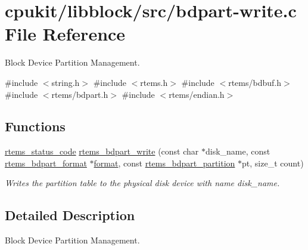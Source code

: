 \hypertarget{bdpart-write_8c}{}\section{cpukit/libblock/src/bdpart-\/write.c File Reference}
\label{bdpart-write_8c}


Block Device Partition Management.  


{\ttfamily \#include $<$string.\+h$>$}\newline
{\ttfamily \#include $<$rtems.\+h$>$}\newline
{\ttfamily \#include $<$rtems/bdbuf.\+h$>$}\newline
{\ttfamily \#include $<$rtems/bdpart.\+h$>$}\newline
{\ttfamily \#include $<$rtems/endian.\+h$>$}\newline
\subsection*{Functions}
\begin{DoxyCompactItemize}
\item 
\mbox{\hyperlink{group__ClassicStatus_ga545d41846817eaba6143d52ee4d9e9fe}{rtems\+\_\+status\+\_\+code}} \mbox{\hyperlink{group__rtems__bdpart_gaa8b69004c352fe7867bdcb551453beb0}{rtems\+\_\+bdpart\+\_\+write}} (const char $\ast$disk\+\_\+name, const \mbox{\hyperlink{unionrtems__bdpart__format}{rtems\+\_\+bdpart\+\_\+format}} $\ast$\mbox{\hyperlink{structformat}{format}}, const \mbox{\hyperlink{structrtems__bdpart__partition}{rtems\+\_\+bdpart\+\_\+partition}} $\ast$pt, size\+\_\+t count)
\begin{DoxyCompactList}\small\item\em Writes the partition table to the physical disk device with name {\itshape disk\+\_\+name}. \end{DoxyCompactList}\end{DoxyCompactItemize}


\subsection{Detailed Description}
Block Device Partition Management. 

